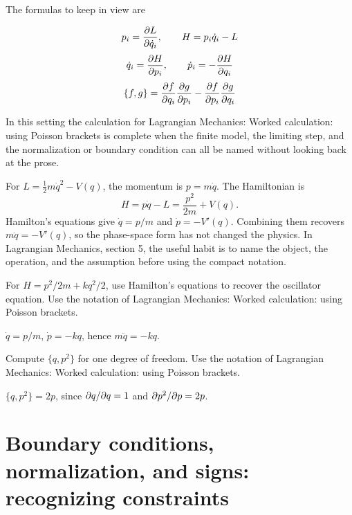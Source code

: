 The formulas to keep in view are

\[
  p_i=\frac{\partial L}{\partial\dot q_i},\qquad H=p_i\dot q_i-L
\]
\[
  \dot q_i=\frac{\partial H}{\partial p_i},\qquad \dot p_i=-\frac{\partial H}{\partial q_i}
\]
\[
  \{f,g\}=\frac{\partial f}{\partial q_i}\frac{\partial g}{\partial p_i}-\frac{\partial f}{\partial p_i}\frac{\partial g}{\partial q_i}
\]

In this setting the calculation for Lagrangian Mechanics: Worked calculation: using Poisson brackets is complete when the finite model, the limiting step, and the normalization or boundary condition can all be named without looking back at the prose.




\begin{example}
For \(L=\frac12m\dot q^2-V(q)\), the momentum is \(p=m\dot q\).  The Hamiltonian is
\[
  H=p\dot q-L=\frac{p^2}{2m}+V(q).
\]
Hamilton's equations give \(\dot q=p/m\) and \(\dot p=-V'(q)\).  Combining them recovers \(m\ddot q=-V'(q)\), so the phase-space form has not changed the physics.  In Lagrangian Mechanics, section 5, the useful habit is to name the object, the operation, and the assumption before using the compact notation.
\end{example}



\begin{exercise}
For \(H=p^2/2m+kq^2/2\), use Hamilton's equations to recover the oscillator equation.  Use the notation of Lagrangian Mechanics: Worked calculation: using Poisson brackets.
\begin{answer}
\(\dot q=p/m\), \(\dot p=-kq\), hence \(m\ddot q=-kq\).
\end{answer}
\end{exercise}

\begin{exercise}
Compute \(\{q,p^2\}\) for one degree of freedom.  Use the notation of Lagrangian Mechanics: Worked calculation: using Poisson brackets.
\begin{answer}
\(\{q,p^2\}=2p\), since \(\partial q/\partial q=1\) and \(\partial p^2/\partial p=2p\).
\end{answer}
\end{exercise}



\section{Boundary conditions, normalization, and signs: recognizing constraints}

